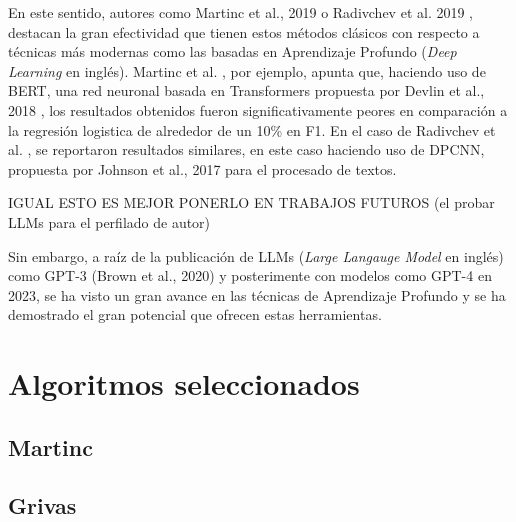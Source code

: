 \bigskip
En este sentido, autores como Martinc et al., 2019 \cite{martinc2019hot} o Radivchev et al. 2019 \cite{radivchev2019celebrity}, destacan 
la gran efectividad que tienen estos métodos clásicos
con respecto a técnicas más modernas como las basadas en Aprendizaje Profundo (\textit{Deep Learning} en inglés). Martinc et al. \cite{martinc2019hot}, por ejemplo,
apunta que, haciendo uso de BERT, una red neuronal basada en Transformers propuesta por Devlin et al., 2018 \cite{devlin2018bert},
los resultados obtenidos fueron significativamente peores en comparación a la regresión logistica de alrededor de un 10\% en F1. En el caso
de Radivchev et al. \cite{radivchev2019celebrity}, se reportaron resultados similares, en este caso haciendo uso de DPCNN, propuesta por
Johnson et al., 2017 \cite{johnson2017deep} para el procesado de textos.

\bigskip
IGUAL ESTO ES MEJOR PONERLO EN TRABAJOS FUTUROS (el probar LLMs para el perfilado de autor)

Sin embargo, a raíz de la publicación de LLMs (\textit{Large Langauge Model} en inglés) como GPT-3 (Brown et al., 2020) \cite{brown2020language}
y posterimente con modelos como GPT-4 en 2023, se ha visto un gran avance en las técnicas de Aprendizaje Profundo
y se ha demostrado el gran potencial que ofrecen estas herramientas.

\section{Algoritmos seleccionados}
\label{sec:algoritmos_seleccionados}

\subsection{Martinc}
\label{sec:algoritmos_martinc}

\subsection{Grivas}
\label{sec:algoritmos_grivas}
